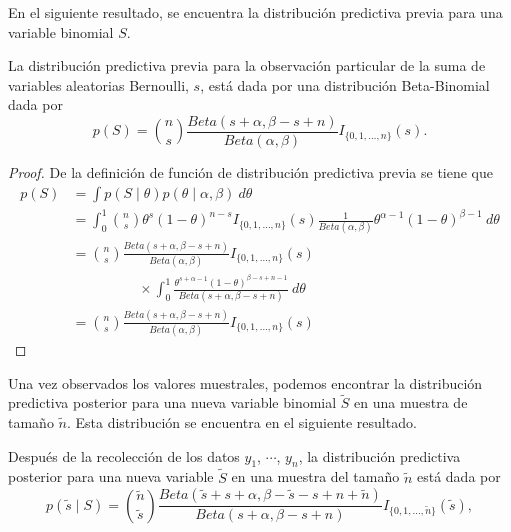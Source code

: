     En el siguiente resultado, se encuentra la distribuci\'on predictiva previa para una variable binomial $S$.
    
    \begin{Res}
    La distribuci\'on predictiva previa para la observaci\'on particular de la suma de variables aleatorias Bernoulli, $s$, est\'a dada por una distribuci\'on Beta-Binomial dada por
    \begin{equation}
    p(S)=\binom{n}{s}\frac{Beta(s+\alpha,\beta-s+n)}{Beta(\alpha,\beta)}I_{\{0,1,\ldots,n\}}(s).
    \end{equation}
    \end{Res}
    
    \begin{proof}
    De la definici\'on de funci\'on de distribuci\'on predictiva previa se tiene que
    \begin{align*}
    p(S)&=\int p(S \mid \theta)p(\theta \mid \alpha,\beta)\ d\theta\\
    &=\int_0^1\binom{n}{s}\theta^s(1-\theta)^{n-s}I_{\{0,1,\ldots,n\}}(s)
    \frac{1}{Beta(\alpha,\beta)}\theta^{\alpha-1}(1-\theta)^{\beta-1}\ d\theta\\
    &=\binom{n}{s}\frac{Beta(s+\alpha,\beta-s+n)}{Beta(\alpha,\beta)}I_{\{0,1,\ldots,n\}}(s)\\
    &\hspace{2cm}\times\int_0^1\frac{\theta^{s+\alpha-1}(1-\theta)^{\beta-s+n-1}}{Beta(s+\alpha,\beta-s+n)}\ d\theta\\
    &=\binom{n}{s}\frac{Beta(s+\alpha,\beta-s+n)}{Beta(\alpha,\beta)}I_{\{0,1,\ldots,n\}}(s)
    \end{align*}
    \end{proof}
    
    
    Una vez observados los valores muestrales, podemos encontrar la distribuci\'on predictiva posterior para una nueva variable binomial $\tilde{S}$ en una muestra de tama\~no $\tilde{n}$. Esta distribuci\'on se encuentra en el siguiente resultado.
    \begin{Res}
    \label{ResPredBinom}
    Despu\'es de la recolecci\'on de los datos $y_1$, $\cdots$, $y_n$, la distribuci\'on predictiva posterior para una nueva variable $\tilde{S}$ en una muestra del tama\~no $\tilde{n}$ est\'a dada por
    \begin{equation}\label{Binom_predict}
    p(\tilde{s} \mid S)=\binom{\tilde{n}}{\tilde{s}}\frac{Beta(\tilde{s}+s+\alpha,\beta-\tilde{s}-s+n+\tilde{n})}{Beta(s+\alpha,\beta-s+n)}I_{\{0,1,\ldots,\tilde{n}\}}(\tilde{s}),
    \end{equation}
    \end{Res}
    

